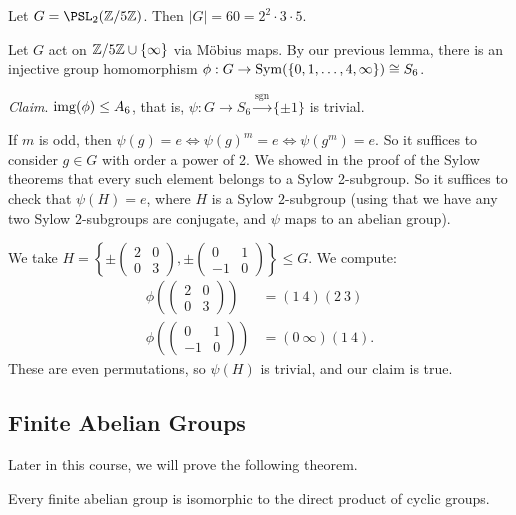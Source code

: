 \documentclass[a4paper]{scrartcl}
\begin{document}
\begin{example}
	Let $G = \PSL_2(\Z/5\Z)$. Then $|G| = 60 = 2^2 \cdot 3 \cdot 5$.

	Let $G$ act on $\mathbb{Z}/5\mathbb{Z} \cup \{\infty\}$ via Möbius maps. By our previous lemma, there is an injective group homomorphism $\phi : G \rightarrow \operatorname{Sym}(\{0, 1, \dots, 4, \infty\}) \cong S_6$.

	\emph{Claim}. $\operatorname{img}(\phi) \leq A_6$, that is, $\psi: G \rightarrow S_6 \xrightarrow{\operatorname{sgn}} \{\pm 1\}$ is trivial.

	If $m$ is odd, then $\psi(g) = e \iff \psi(g)^m = e \iff \psi(g^m) = e$. So it suffices to consider $g \in G$ with order a power of 2. We showed in the proof of the Sylow theorems that every such element belongs to a Sylow 2-subgroup. So it suffices to check that $\psi(H) = e$, where $H$ is a Sylow $2$-subgroup (using that we have any two Sylow $2$-subgroups are conjugate, and $\psi$ maps to an abelian group). 

	We take $H =\left\{ \pm \begin{pmatrix}
		2 & 0 \\ 0 & 3
	\end{pmatrix},\pm \begin{pmatrix}
		0 & 1 \\ -1 & 0 
	\end{pmatrix} \right \} \leq G$. We compute:
	\begin{align*}
		\phi\left(\begin{pmatrix}
			2 & 0 \\ 0 & 3
		\end{pmatrix}\right) &= (1\ 4)(2\ 3)\\
		\phi\left(\begin{pmatrix}
		0 & 1 \\ -1 & 0
		\end{pmatrix}\right) &= (0\ \infty)(1\ 4).
	\end{align*} 
	These are even permutations, so $\psi(H)$ is trivial, and our claim is true.
\end{example}

\subsection{Finite Abelian Groups}

Later in this course, we will prove the following theorem.

\begin{theorem}
	Every finite abelian group is isomorphic to the direct product of cyclic groups.
\end{theorem}
\end{document}
